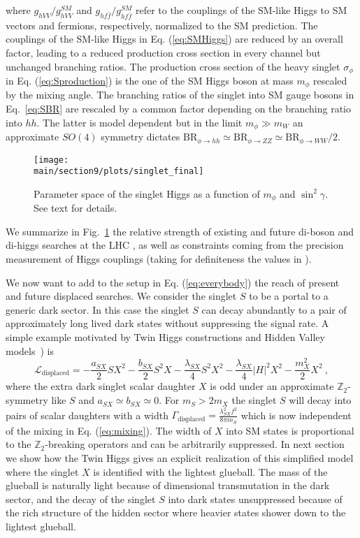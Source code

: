where $g_{hVV}/g_{hVV}^{SM}$ and $g_{hf\bar f}/g_{hf\bar f}^{SM}$ refer to the couplings of the SM-like Higgs to SM vectors and fermions, respectively, normalized to the SM prediction. The couplings of the SM-like Higgs in Eq. (\ref{eq:SMHiggs}) are reduced by an overall factor, leading to a reduced production cross section in every channel but unchanged branching ratios. The production cross section of the heavy singlet $\sigma_\phi$ in Eq. (\ref{eq:Sproduction}) is the one of the SM Higgs boson at mass $m_\phi$ rescaled by the mixing angle.  The branching ratios of the singlet into SM gauge bosons in Eq.~\eqref{eq:SBR} are rescaled by a common factor depending on the branching ratio into $hh$. The latter is model dependent but in the limit $m_\phi\gg m_W$ an approximate $SO(4)$ symmetry dictates $\text{BR}_{\phi\to hh }\simeq \text{BR}_{\phi\to ZZ}\simeq \text{BR}_{\phi\to WW} /2$.

\begin{figure}[t]
\texttt{[image: \\main/section9/plots/singlet\_final]}
\centering
\caption{Parameter space of the singlet Higgs as a function of $m_\phi$ and $\sin^2 \gamma$. See text for details.
\label{fig:singlet}
}
\end{figure}
We summarize in Fig.~\ref{fig:singlet} the relative strength of existing and future di-boson and di-higgs searches at the LHC \cite{Sirunyan:2018qlb,Aaboud:2018knk,Sirunyan:2017isc,ATLAS:2017spa}, as well as constraints coming from the precision measurement of Higgs couplings (taking for definiteness the values in \cite{Dawson:2013bba}). 

We now want to add to the setup in Eq. (\ref{eq:everybody}) the reach of present and future displaced searches.  We consider the singlet $S$ to be a portal to a generic dark sector. In this case the singlet $S$ can decay abundantly to a pair of approximately long lived  dark states without suppressing the signal rate. A simple example motivated by Twin Higgs constructions \cite{Craig:2015pha} and Hidden Valley models~\cite{Strassler:2006ri,Han:2007ae}) is 
\begin{equation}
\mathcal{L}_{\text{displaced}}=-\frac{a_{SX}}{2} S X^2-\frac{b_{SX}}{2} S^2 X-\frac{\lambda_{SX}}{4} S^2 X^2-\frac{\lambda_{SX}}{4} \vert H\vert^2 X^2-\frac{m_X^2}{2} X^2\ ,
\end{equation} 
where  the extra dark singlet scalar daughter $X$ is odd under an approximate $\mathbb{Z}_2$-symmetry like $S$ and $a_{SX}\simeq b_{SX}\simeq0$. For $m_S>2 m_X$ the singlet $S$ will decay into pairs of scalar daughters with a width $\Gamma_{\text{displaced}}=\frac{\lambda_{SX}^2 f^2}{8\pi m_S}$ which is now independent of the mixing in Eq. (\ref{eq:mixing}). The width of $X$ into SM states is proportional to the $\mathbb{Z}_2$-breaking operators and can be arbitrarily suppressed. In next section we show how the Twin Higgs gives an explicit realization of this simplified model where the singlet $X$ is identified with the lightest glueball. The mass of the glueball is naturally light because of dimensional transmutation in the dark sector, and the decay of the singlet $S$ into dark states unsuppressed because of the rich structure of the hidden sector where heavier states shower down to the lightest glueball. 

